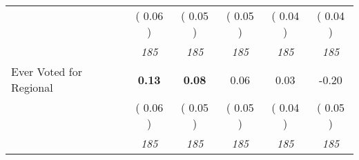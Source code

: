 \begin{tabular}{l c c c c c}
& (     0.06 ) & (     0.05 ) & (     0.05 ) & (     0.04 ) & (     0.04 ) \\
& \textit{ 185 } & \textit{ 185 } & \textit{ 185 } & \textit{ 185 } & \textit{ 185 } \\
Ever Voted for Regional & \textbf{      0.13 } & \textbf{      0.08 } &      0.06 &      0.03 &     -0.20 \\
& (     0.06 ) & (     0.05 ) & (     0.05 ) & (     0.04 ) & (     0.05 ) \\
& \textit{ 185 } & \textit{ 185 } & \textit{ 185 } & \textit{ 185 } & \textit{ 185 } \\
\bottomrule
\end{tabular}
